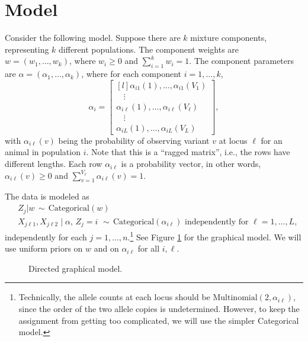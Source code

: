 \documentclass[12pt]{article}
\begin{document}
\section{Model}

Consider the following model. Suppose there are $k$ mixture components, representing $k$ different populations. 
The component weights are $w = (w_1,\ldots,w_k)$, where $w_i \geq 0$ and $\sum_{i = 1}^k w_i = 1$. The component parameters are $\alpha =(\alpha_1,\ldots,\alpha_k)$, where for each component $i = 1,\ldots,k$,
$$\alpha_i = \begin{bmatrix*}[l] 
\alpha_{i 1}(1),\ldots,\alpha_{i 1}(V_1)\\
~~~~\vdots\\
\alpha_{i \ell}(1),\ldots,\alpha_{i \ell}(V_\ell)\\
~~~~\vdots\\
\alpha_{i L}(1),\ldots,\alpha_{i L}(V_L)
\end{bmatrix*},$$
with $\alpha_{i \ell}(v)$ being the probability of observing variant $v$ at locus $\ell$ for an animal in population $i$. Note that this is a ``ragged matrix'', i.e., the rows have different lengths. Each row $\alpha_{i \ell}$ is a probability vector, in other words, $\alpha_{i \ell}(v) \geq 0$ and $\sum_{v = 1}^{V_\ell} \alpha_{i \ell}(v) = 1$. 

The data is modeled as
\begin{align*}
& Z_j | w \,\sim\, \mathrm{Categorical}(w)\\
& X_{j \ell 1},X_{j \ell 2} \mid \alpha,\,Z_j = i \,\,\sim\,\mathrm{Categorical}(\alpha_{i\ell}) \text{ independently for $\ell=1,\ldots,L$,}
\end{align*}
independently for each $j = 1,\ldots,n$.\footnote{Technically, the allele counts at each locus should be $\mathrm{Multinomial}(2,\alpha_{i \ell})$, since the order of the two allele copies is undetermined. However, to keep the assignment from getting too complicated, we will use the simpler Categorical model.}
See Figure \ref{figure:model} for the graphical model.
We will use uniform priors on $w$ and on $\alpha_{i \ell}$ for all $i,\ell$.

\begin{figure}[ht]

\caption{Directed graphical model.}
\label{figure:model}
\end{figure}
\end{document}
